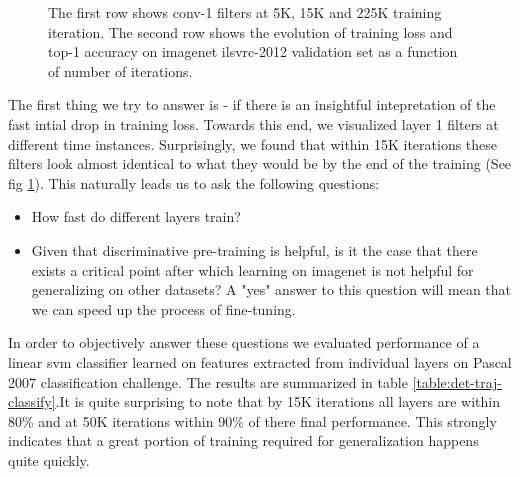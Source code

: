 \documentclass[runningheads]{llncs}
\begin{document}
\begin{figure}
\caption{The first row shows conv-1 filters at 5K, 15K and 225K training iteration. The second row shows the evolution of training loss and top-1 accuracy on imagenet ilsvrc-2012 validation set as a function of number of iterations.}
\label{fig:conv1}
\end{figure}

The first thing we try to answer is - if there is an insightful intepretation of the fast intial drop in training loss. Towards this end, we visualized layer 1 filters at different time instances. Surprisingly, we found that within 15K iterations these filters look almost identical to what they would be by the end of the training (See fig \ref{fig:conv1}). This naturally leads us to ask the following questions:
\begin{itemize}
\item {How fast do different layers train? }
\item {Given that discriminative pre-training is helpful, is it the case that there exists a critical point after which learning on imagenet is not helpful for generalizing on other datasets? A "yes" answer to this question will mean that we can speed up the process of fine-tuning.}
\end{itemize}  

In order to objectively answer these questions we evaluated performance of a linear svm classifier learned on features extracted from individual layers on Pascal 2007 classification challenge. The results are summarized in table \ref{table:det-traj-classify}.It is quite surprising to note that by 15K iterations all layers are within 80\% and at 50K iterations within 90\% of there final performance. This strongly indicates that a great portion of training required for generalization happens quite quickly. 
\end{document}
